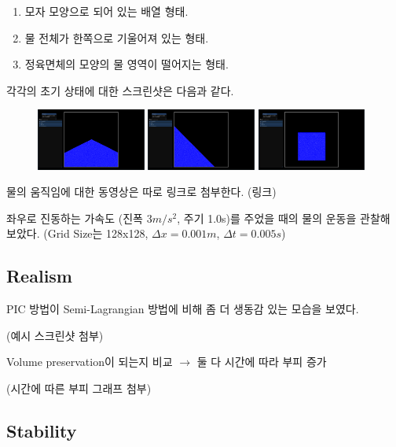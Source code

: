 \documentclass[10pt, A4]{article}
\begin{document}
\begin{enumerate}
  \item 모자 모양으로 되어 있는 배열 형태.
  \item 물 전체가 한쪽으로 기울어져 있는 형태.
  \item 정육면체의 모양의 물 영역이 떨어지는 형태.
\end{enumerate}

각각의 초기 상태에 대한 스크린샷은 다음과 같다.

\begin{figure}[h]
\includegraphics[width=0.32\textwidth]{init_state_1}
\includegraphics[width=0.32\textwidth]{init_state_2}
\includegraphics[width=0.32\textwidth]{init_state_3}
\end{figure}

물의 움직임에 대한 동영상은 따로 링크로 첨부한다. (링크)

좌우로 진동하는 가속도 (진폭 3$m/s^2$, 주기 1.0s)를 주었을 때의 물의 운동을 관찰해 보았다. (Grid Size는 128x128, $\Delta x = 0.001m$, $\Delta t = 0.005s$)

\subsection{Realism}

PIC 방법이 Semi-Lagrangian 방법에 비해 좀 더 생동감 있는 모습을 보였다.

(예시 스크린샷 첨부)

Volume preservation이 되는지 비교 $\rightarrow$ 둘 다 시간에 따라 부피 증가

(시간에 따른 부피 그래프 첨부)

\subsection{Stability}
\end{document}
